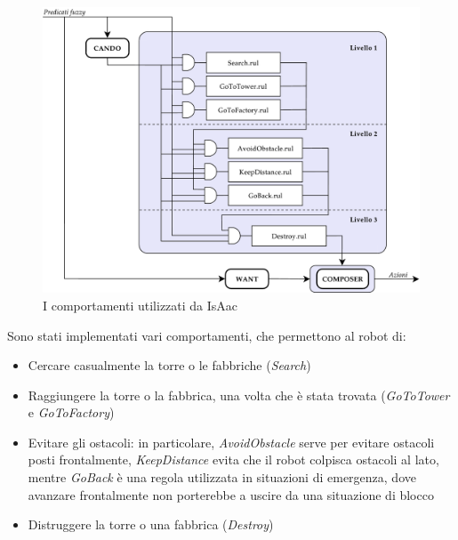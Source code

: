 \begin{figure}[h]
\centering
\includegraphics[scale=0.35]{images/schemafuzzy}
\caption{I comportamenti utilizzati da IsAac}
\label{fig:schemafuzzy}
\end{figure}

\noindent Sono stati implementati vari comportamenti, che permettono al robot di:
\begin{itemize}
 \item Cercare casualmente la torre o le fabbriche (\emph{Search})
 \item Raggiungere la torre o la fabbrica, una volta che è stata trovata (\emph{GoToTower} e \textit{GoToFactory})
 \item Evitare gli ostacoli: in particolare, \emph{AvoidObstacle} serve per evitare ostacoli posti frontalmente, \emph{KeepDistance} evita che il robot colpisca ostacoli al lato, mentre \emph{GoBack} è una regola utilizzata in situazioni di emergenza, dove avanzare frontalmente non porterebbe a uscire da una situazione di blocco
 \item Distruggere la torre o una fabbrica (\emph{Destroy})
\end{itemize}
